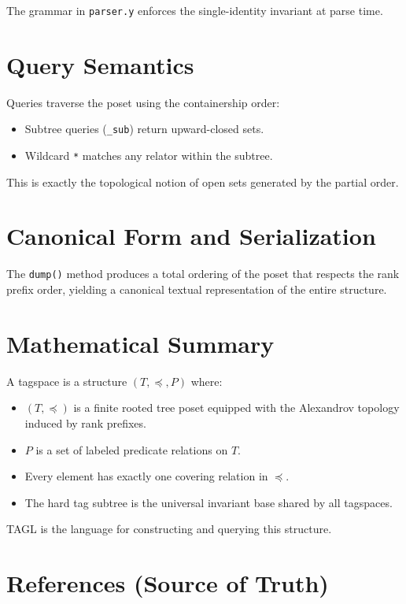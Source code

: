 \documentclass[11pt,a4paper]{article}
\begin{document}
The grammar in \texttt{parser.y} enforces the single-identity invariant at parse time.

\section{Query Semantics}

Queries traverse the poset using the containership order:
\begin{itemize}
    \item Subtree queries (\texttt{\_sub}) return upward-closed sets.
    \item Wildcard \texttt{*} matches any relator within the subtree.
\end{itemize}

This is exactly the topological notion of open sets generated by the partial order.

\section{Canonical Form and Serialization}

The \texttt{dump()} method produces a total ordering of the poset that respects the rank prefix order, yielding a canonical textual representation of the entire structure.

\section{Mathematical Summary}

A tagspace is a structure \( (T, \preceq, P) \) where:

\begin{itemize}
    \item \( (T, \preceq) \) is a finite rooted tree poset equipped with the Alexandrov topology induced by rank prefixes.
    \item \( P \) is a set of labeled predicate relations on \( T \).
    \item Every element has exactly one covering relation in \( \preceq \).
    \item The hard tag subtree is the universal invariant base shared by all tagspaces.
\end{itemize}

TAGL is the language for constructing and querying this structure.

\section{References (Source of Truth)}
\end{document}
